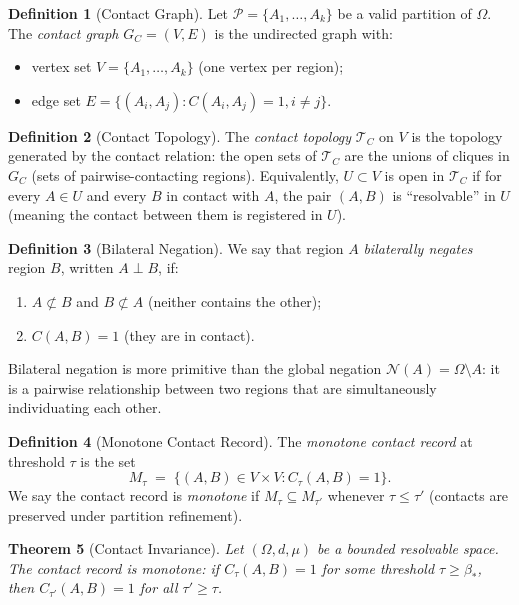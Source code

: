 \documentclass[twocolumn]{article}
\theoremstyle{plain}
\newtheorem{theorem}{Theorem}[section]
\theoremstyle{definition}
\newtheorem{definition}[theorem]{Definition}
\newcommand{\PP}{\mathcal{P}}
\newcommand{\NN}{\mathcal{N}}
\newcommand{\TC}{\mathcal{T}_C}
\newcommand{\GC}{G_C}
\newcommand{\bstar}{\beta_*}
\begin{document}
\begin{definition}[Contact Graph]
\label{def:contactgraph}
Let $\PP = \{A_1, \ldots, A_k\}$ be a valid partition of $\Omega$. The
\emph{contact graph} $\GC = (V, E)$ is the undirected graph with:
\begin{itemize}
\item vertex set $V = \{A_1, \ldots, A_k\}$ (one vertex per region);
\item edge set $E = \{(A_i, A_j) : C(A_i, A_j) = 1, i \neq j\}$.
\end{itemize}
\end{definition}

\begin{definition}[Contact Topology]
\label{def:contacttop}
The \emph{contact topology} $\TC$ on $V$ is the topology generated by the
contact relation: the open sets of $\TC$ are the unions of cliques in $\GC$
(sets of pairwise-contacting regions). Equivalently, $U \subset V$ is open in
$\TC$ if for every $A \in U$ and every $B$ in contact with $A$, the pair
$(A,B)$ is ``resolvable'' in $U$ (meaning the contact between them is registered
in $U$).
\end{definition}

\begin{definition}[Bilateral Negation]
\label{def:bilateral}
We say that region $A$ \emph{bilaterally negates} region $B$, written $A \perp B$,
if:
\begin{enumerate}[label=(\roman*)]
\item $A \not\subset B$ and $B \not\subset A$ (neither contains the other);
\item $C(A,B) = 1$ (they are in contact).
\end{enumerate}
Bilateral negation is more primitive than the global negation $\NN(A) =
\Omega \setminus A$: it is a pairwise relationship between two regions that
are simultaneously individuating each other.
\end{definition}

\begin{definition}[Monotone Contact Record]
\label{def:monotone}
The \emph{monotone contact record} at threshold $\tau$ is the set
\[
  M_\tau \;=\; \{(A,B) \in V \times V : C_\tau(A,B) = 1\}.
\]
We say the contact record is \emph{monotone} if $M_\tau \subseteq M_{\tau'}$
whenever $\tau \leq \tau'$ (contacts are preserved under partition refinement).
\end{definition}

\begin{theorem}[Contact Invariance]
\label{thm:invariance}
Let $(\Omega, d, \mu)$ be a bounded resolvable space. The contact record is
monotone: if $C_\tau(A,B) = 1$ for some threshold $\tau \geq \bstar$, then
$C_{\tau'}(A,B) = 1$ for all $\tau' \geq \tau$.
\end{theorem}
\end{document}

